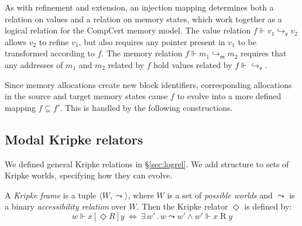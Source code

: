 \documentclass[sigplan,screen]{acmart}
\newcommand{\kw}[1]{\ensuremath{ \mathsf{#1} }}
\newcommand{\ifr}[1]{\mathrel{[{#1}]}}
\begin{document}
As with refinement and extension,
an injection mapping determines both
a relation on values and
a relation on memory states,
which work together
as a logical relation for the CompCert memory model.
The value relation $f \Vdash v_1 \hookrightarrow_\kw{v} v_2$
allows $v_2$ to refine $v_1$,
but also requires any pointer present in $v_1$
to be transformed according to $f$.
The memory relation $f \Vdash m_1 \hookrightarrow_\kw{m} m_2$
requires that any addresses of $m_1$ and $m_2$ related by $f$
hold values related by $f \Vdash {\hookrightarrow_\kw{v}}$.

Since memory allocations create new block identifiers,
corresponding allocations
in the source and target memory states cause $f$ to
evolve into a more defined mapping $f \subseteq f'$.
This is handled by the following constructions.


\subsection{Modal Kripke relators} %

We defined general Kripke relations in \S\ref{sec:logrel}.
We add structure to sets of Kripke worlds,
specifying how they can evolve.

\begin{definition} %
A \emph{Kripke frame} is a tuple
$\langle W, {\leadsto} \rangle$, where
$W$ is a set of \emph{possible worlds} and
$\leadsto$ is a
binary \emph{accessibility relation} over $W$.
Then the Kripke relator $\Diamond$ is defined by:
\[
  w \Vdash x \ifr{\Diamond R} y \: \Leftrightarrow \:
    \exists \, w' \,.\, w \leadsto w' \wedge
      w' \Vdash x \mathrel{R} y
\]
\end{definition}
\end{document}
